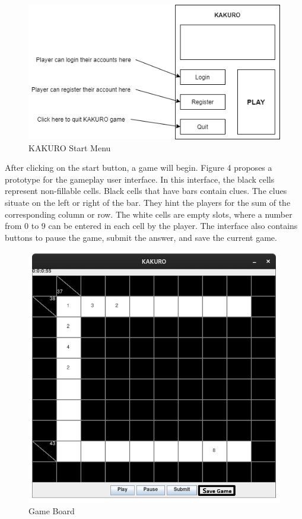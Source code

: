 \documentclass[12pt]{article}
\begin{document}
\begin{figure}[htbp]
    \centering
    \includegraphics[scale=0.8]{iteration1/images/UI-1.png}
    \caption{KAKURO Start Menu}
    \label{fig:UI-1}
\end{figure}

After clicking on the start button, a game will begin. Figure 4 proposes a prototype for the gameplay user interface. In this interface, the black cells represent non-fillable cells. Black cells that have bars contain clues. The clues situate on the left or right of the bar. They hint the players for the sum of the corresponding column or row. The white cells are empty slots, where a number from 0 to 9 can be entered in each cell by the player. The interface also contains buttons to pause the game, submit the answer, and save the current game. 

\begin{figure}[htbp]
    \centering
    \includegraphics[scale=0.5]{UI-0.png}
    \caption{Game Board}
    \label{fig:UI-0}
\end{figure}
\end{document}
